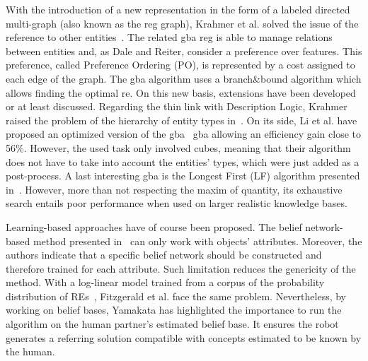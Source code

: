 With the introduction of a new representation in the form of a labeled directed multi-graph (also known as the \acrshort{reg} graph), Krahmer et al. solved the issue of the reference to other entities~\cite{krahmer_2003_graph}. The related \acrfull{gba} \acrshort{reg} is able to manage relations between entities and, as Dale and Reiter, consider a preference over features. This preference, called Preference Ordering (PO), is represented by a cost assigned to each edge of the graph. The \acrshort{gba} algorithm uses a branch\&bound algorithm which allows finding the optimal \acrshort{re}. On this new basis, extensions have been developed or at least discussed. Regarding the thin link with Description Logic, Krahmer raised the problem of the hierarchy of entity types in~\cite{krahmer_2012_computational}. On its side, Li et al. have proposed an optimized version of the \acrshort{gba}~\cite{li_2017_automatically} \acrshort{gba} allowing an efficiency gain close to 56\%. However, the used task only involved cubes, meaning that their algorithm does not have to take into account the entities' types, which were just added as a post-process. A last interesting \acrshort{gba} is the Longest First (LF) algorithm presented in~\cite{viethen_2013_graphs}. However, more than not respecting the maxim of quantity, its exhaustive search entails poor performance when used on larger realistic knowledge bases.

Learning-based approaches have of course been proposed. The belief network-based method presented in~\cite{yamakata_2004_belief} can only work with objects' attributes. Moreover, the authors indicate that a specific belief network should be constructed and therefore trained for each attribute. Such limitation reduces the genericity of the method. With a log-linear model trained from a corpus of the probability distribution of REs~\cite{fitzgerald_2013_learning}, Fitzgerald et al. face the same problem. Nevertheless, by working on belief bases, Yamakata has highlighted the importance to run the algorithm on the human partner's estimated belief base. It ensures the robot generates a referring solution compatible with concepts estimated to be known by the human.

